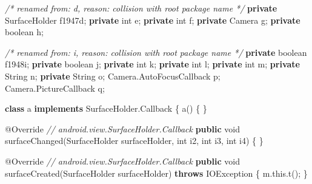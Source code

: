 \documentclass[
]{article}
\newenvironment{Shaded}{}{}
\newcommand{\AttributeTok}[1]{\textcolor[rgb]{0.49,0.56,0.16}{#1}}
\newcommand{\BuiltInTok}[1]{\textcolor[rgb]{0.00,0.50,0.00}{#1}}
\newcommand{\CommentTok}[1]{\textcolor[rgb]{0.38,0.63,0.69}{\textit{#1}}}
\newcommand{\DataTypeTok}[1]{\textcolor[rgb]{0.56,0.13,0.00}{#1}}
\newcommand{\FunctionTok}[1]{\textcolor[rgb]{0.02,0.16,0.49}{#1}}
\newcommand{\KeywordTok}[1]{\textcolor[rgb]{0.00,0.44,0.13}{\textbf{#1}}}
\newcommand{\NormalTok}[1]{#1}
\newcommand{\OperatorTok}[1]{\textcolor[rgb]{0.40,0.40,0.40}{#1}}
\begin{document}
\begin{Shaded}
\begin{Highlighting}[]
    \CommentTok{/* renamed from: d, reason: collision with root package name */}
    \KeywordTok{private}\NormalTok{ SurfaceHolder f1947d}\OperatorTok{;}
    \KeywordTok{private} \DataTypeTok{int}\NormalTok{ e}\OperatorTok{;}
    \KeywordTok{private} \DataTypeTok{int}\NormalTok{ f}\OperatorTok{;}
    \KeywordTok{private}\NormalTok{ Camera g}\OperatorTok{;}
    \KeywordTok{private} \DataTypeTok{boolean}\NormalTok{ h}\OperatorTok{;}

    \CommentTok{/* renamed from: i, reason: collision with root package name */}
    \KeywordTok{private} \DataTypeTok{boolean}\NormalTok{ f1948i}\OperatorTok{;}
    \KeywordTok{private} \DataTypeTok{boolean}\NormalTok{ j}\OperatorTok{;}
    \KeywordTok{private} \DataTypeTok{int}\NormalTok{ k}\OperatorTok{;}
    \KeywordTok{private} \DataTypeTok{int}\NormalTok{ l}\OperatorTok{;}
    \KeywordTok{private} \DataTypeTok{int}\NormalTok{ m}\OperatorTok{;}
    \KeywordTok{private} \BuiltInTok{String}\NormalTok{ n}\OperatorTok{;}
    \KeywordTok{private} \BuiltInTok{String}\NormalTok{ o}\OperatorTok{;}
\NormalTok{    Camera}\OperatorTok{.}\FunctionTok{AutoFocusCallback}\NormalTok{ p}\OperatorTok{;}
\NormalTok{    Camera}\OperatorTok{.}\FunctionTok{PictureCallback}\NormalTok{ q}\OperatorTok{;}

    \KeywordTok{class}\NormalTok{ a }\KeywordTok{implements}\NormalTok{ SurfaceHolder}\OperatorTok{.}\FunctionTok{Callback} \OperatorTok{\{}
        \FunctionTok{a}\OperatorTok{()} \OperatorTok{\{}
        \OperatorTok{\}}

        \AttributeTok{@Override} \CommentTok{// android.view.SurfaceHolder.Callback}
        \KeywordTok{public} \DataTypeTok{void} \FunctionTok{surfaceChanged}\OperatorTok{(}\NormalTok{SurfaceHolder surfaceHolder}\OperatorTok{,} \DataTypeTok{int}\NormalTok{ i2}\OperatorTok{,} \DataTypeTok{int}\NormalTok{ i3}\OperatorTok{,} \DataTypeTok{int}\NormalTok{ i4}\OperatorTok{)} \OperatorTok{\{}
        \OperatorTok{\}}

        \AttributeTok{@Override} \CommentTok{// android.view.SurfaceHolder.Callback}
        \KeywordTok{public} \DataTypeTok{void} \FunctionTok{surfaceCreated}\OperatorTok{(}\NormalTok{SurfaceHolder surfaceHolder}\OperatorTok{)} \KeywordTok{throws} \BuiltInTok{IOException} \OperatorTok{\{}
\NormalTok{            m}\OperatorTok{.}\FunctionTok{this}\OperatorTok{.}\FunctionTok{t}\OperatorTok{();}
        \OperatorTok{\}}


\end{Highlighting}
\end{Shaded}
\end{document}

